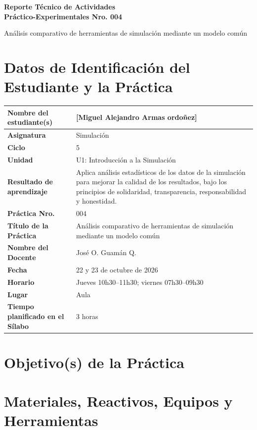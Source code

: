 \documentclass[11pt,a4paper]{article}
\begin{document}
\thispagestyle{fancy}
\begin{center}
{\bfseries\fontsize{21}{24}\selectfont Reporte Técnico de Actividades\\ Práctico-Experimentales Nro. 004\par}
\vspace{0.25cm}
{\large Análisis comparativo de herramientas de simulación mediante un modelo común}
\end{center}

\section{Datos de Identificación del Estudiante y la Práctica}
\begin{tabularx}{\textwidth}{|L{0.43\textwidth}|Y|}
\hline
\textbf{Nombre del estudiante(s)} & [Miguel Alejandro Armas ordoñez] \\ \hline
\textbf{Asignatura} & Simulación \\ \hline
\textbf{Ciclo} & 5 \\ \hline
\textbf{Unidad} & U1: Introducción a la Simulación \\ \hline
\textbf{Resultado de aprendizaje} & Aplica análisis estadísticos de los datos de la simulación para mejorar la calidad de los resultados, bajo los principios de solidaridad, transparencia, responsabilidad y honestidad. \\ \hline
\textbf{Práctica Nro.} & 004 \\ \hline
\textbf{Título de la Práctica} & Análisis comparativo de herramientas de simulación mediante un modelo común \\ \hline
\textbf{Nombre del Docente} & José O. Guamán Q. \\ \hline
\textbf{Fecha} & 22 y 23 de octubre de 2026 \\ \hline
\textbf{Horario} & Jueves 10h30--11h30; viernes 07h30--09h30 \\ \hline
\textbf{Lugar} & Aula \\ \hline
\textbf{Tiempo planificado en el Sílabo} & 3 horas \\ \hline
\end{tabularx}

\section{Objetivo(s) de la Práctica}


\section{Materiales, Reactivos, Equipos y Herramientas}
\end{document}

